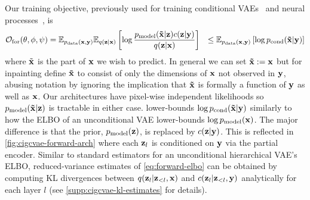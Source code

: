 Our training objective, previously used for training conditional
VAEs~\citep{sohn2015learning,ivanov2018variational} and neural
processes~\citep{garnelo2018neural}, is
\begin{align}
  \label{eq:forward-elbo}
  \mathcal{O}_\mathrm{for}(\theta, \phi, \psi{}) &= \mathbb{E}_{p_{\rm{data}}{}(\mathbf{x}{}, \mathbf{y}{})} \mathbb{E}_{q(\mathbf{z}{}|\mathbf{x}{})} \left[ \log \frac{p_{\rm{model}}{}(\mathbf{\tilde{x}}{}|\mathbf{z}{})c{}(\mathbf{z}{}|\mathbf{y}{})}{q(\mathbf{z}{}|\mathbf{x}{})} \right] &\leq \mathbb{E}_{p_{\rm{data}}{}(\mathbf{x}{}, \mathbf{y}{})} \left[ \log p_{\text{cond}}{}(\mathbf{\tilde{x}}{}|\mathbf{y}{}) \right]
\end{align}
where $\tilde{\mathbf{x}{}}$ is the part of $\mathbf{x}{}$ we wish to predict. In general we can
set $\mathbf{\tilde{x}}{}:=\mathbf{x}{}$ but for inpainting define $\mathbf{\tilde{x}}{}$ to consist of only
the dimensions of $\mathbf{x}{}$ not observed in $\mathbf{y}{}$, abusing notation by
ignoring the implication that $\mathbf{\tilde{x}}{}$ is formally a function of $\mathbf{y}{}$
as well as $\mathbf{x}{}$. Our architectures have pixel-wise independent
likelihoods so $p_{\rm{model}}{}(\mathbf{\tilde{x}}{}|\mathbf{z}{})$ is tractable in either case. 
lower-bounds $\log p_{\text{cond}}{}(\mathbf{\tilde{x}}{}|\mathbf{y}{}) $ similarly to how the ELBO of
an unconditional VAE lower-bounds $\log p_{\rm{model}}{}(\mathbf{x}{})$. The major difference
is that the prior, $p_{\rm{model}}{}(\mathbf{z}{})$, is replaced by $c{}(\mathbf{z}{}|\mathbf{y}{})$.
This is reflected in \cref{fig:cigcvae-forward-arch} where each $\mathbf{z}{}_l$ is conditioned
on $\mathbf{y}{}$ via the partial encoder.
%
Similar to standard estimators for an unconditional hierarchical VAE's ELBO,
reduced-variance estimates of \cref{eq:forward-elbo} can be obtained by
computing KL divergences between $q(\mathbf{z}{}_l|\mathbf{z}{}_{<l},\mathbf{x}{})$ and
$c{}(\mathbf{z}{}_l|\mathbf{z}{}_{<l},\mathbf{y}{})$ analytically for each layer $l$ (see
\cref{supp:cigcvae-kl-estimates} for details).

